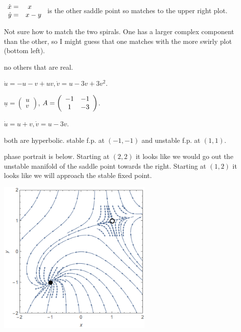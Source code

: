 \documentclass[12pt,letterpaper,noanswers]{exam}
\begin{document}
\begin{questions}
\begin{parts}
$\begin{array}{r l c} \dot{x} = &\ x  \\ \dot{y} = &x- y\end{array} $ is the other saddle point so matches to the upper right plot.

Not sure how to match the two spirals.  One has a larger complex component than the other, so I might guess that one matches with the more swirly plot (bottom left).
    \end{parts}
    
    

\question 
\begin{parts}
\item no others that are real.  
\item $\dot{u} = -u-v+uv, \dot{v} = u-3v+3v^2$.  
\item $\underline{u} = \left(\begin{array}{c} u \\ v \end{array}\right)$, $A = \left(\begin{array}{c c }-1 & -1 \\ 1 & -3 \end{array}\right)$.  
\item $\dot{u} = u+v, \dot{v} = u - 3v$. \item  both are hyperbolic.  stable f.p. at $(-1,-1)$ and unstable f.p. at $(1,1)$.  \item phase portrait is below.  Starting at $(2,2)$ it looks like we would go out the unstable manifold of the saddle point towards the right.  Starting at $(1,2)$ it looks like we will approach the stable fixed point.

\end{parts}

\includegraphics[width=3in]{img/Act19-02-20C08p1.png}

\end{questions}
\end{document}
